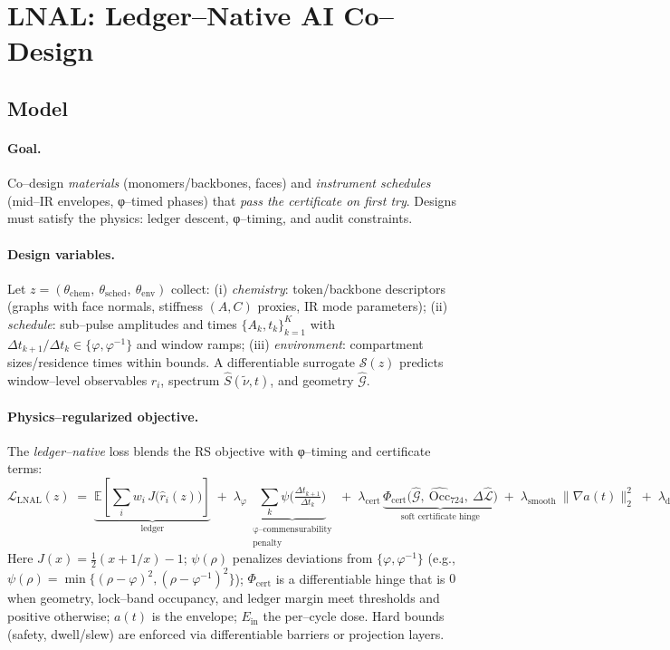 \documentclass[11pt]{article}
\begin{document}
\section{LNAL: Ledger–Native AI Co–Design}\label{sec:lnal}

\subsection{Model}\label{sec:lnal-model}
\paragraph{Goal.}
Co–design \emph{materials} (monomers/backbones, faces) and \emph{instrument schedules} (mid–IR envelopes, φ–timed phases) that \emph{pass the certificate on first try}. Designs must satisfy the physics: ledger descent, φ–timing, and audit constraints.

\paragraph{Design variables.}
Let $z=(\theta_{\mathrm{chem}},\ \theta_{\mathrm{sched}},\ \theta_{\mathrm{env}})$ collect:
(i) \emph{chemistry}: token/backbone descriptors (graphs with face normals, stiffness $(A,C)$ proxies, IR mode parameters); 
(ii) \emph{schedule}: sub–pulse amplitudes and times $\{A_k,t_k\}_{k=1}^{K}$ with $\Delta t_{k+1}/\Delta t_k\in\{\varphi,\varphi^{-1}\}$ and window ramps; 
(iii) \emph{environment}: compartment sizes/residence times within bounds. A differentiable surrogate $\mathcal{S}(z)$ predicts window–level observables $\hat r_i$, spectrum $\hat S(\tilde\nu,t)$, and geometry $\hat{\mathcal{G}}$.

\paragraph{Physics–regularized objective.}
The \emph{ledger–native} loss blends the RS objective with φ–timing and certificate terms:
\[
\mathcal{L}_{\mathrm{LNAL}}(z)\;=\;
\underbrace{\mathbb{E}\!\left[\sum_i w_i\,J\!\big(\hat r_i(z)\big)\right]}_{\text{ledger}}
\;+\;
\lambda_{\varphi}\,\underbrace{\sum_k \psi\!\Big(\tfrac{\Delta t_{k+1}}{\Delta t_k}\Big)}_{\substack{\text{φ–commensurability}\\\text{penalty}}}
\;+\;
\lambda_{\mathrm{cert}}\,\underbrace{\Phi_{\mathrm{cert}}\!\big(\hat{\mathcal{G}},\ \widehat{\mathrm{Occ}}_{724},\ \Delta\widehat{\mathcal{L}}\big)}_{\text{soft certificate hinge}}
\;+\;
\lambda_{\mathrm{smooth}}\ \|\nabla a(t)\|_2^2
\;+\;
\lambda_{\mathrm{dose}}\ \big|E_{\mathrm{in}}-E_{\mathrm{target}}\big|.
\]
Here $J(x)=\tfrac12(x+1/x)-1$; $\psi(\rho)$ penalizes deviations from $\{\varphi,\varphi^{-1}\}$ (e.g., $\psi(\rho)=\min\{(\rho-\varphi)^2,(\rho-\varphi^{-1})^2\}$); $\Phi_{\mathrm{cert}}$ is a differentiable hinge that is $0$ when geometry, lock–band occupancy, and ledger margin meet thresholds and positive otherwise; $a(t)$ is the envelope; $E_{\mathrm{in}}$ the per–cycle dose. Hard bounds (safety, dwell/slew) are enforced via differentiable barriers or projection layers.
\end{document}
